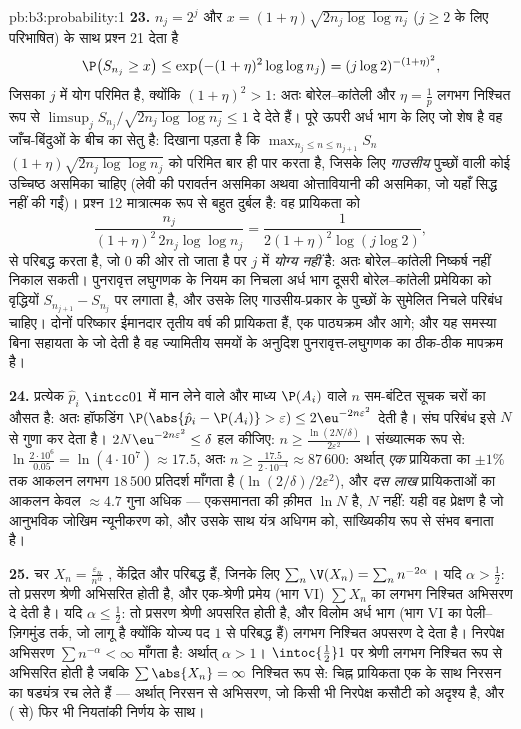 \begin{solution}{pb:b3:probability:1}
\textbf{23.} $n_j = 2^j$ और $x = (1 +
\eta)\sqrt{2n_j\log\log n_j}$ ($j \geq 2$ के लिए परिभाषित)
के साथ प्रश्न 21 देता है
\[
\P\bigl(S_{n_j} \geq x\bigr) \leq \exp\bigl(-(1 +
\eta)^2\log\log n_j\bigr) = (j\log 2)^{-(1+\eta)^2},
\]
जिसका $j$ में योग परिमित है, क्योंकि $(1 + \eta)^2 > 1$:
अतः बोरेल--कांतेली और $\eta = \frac1p$ लगभग निश्चित रूप से
$\limsup_jS_{n_j}/\sqrt{2n_j
\log\log n_j} \leq 1$ दे देते हैं। पूरे ऊपरी अर्ध भाग के लिए
जो शेष है वह जाँच-बिंदुओं के बीच का सेतु है: दिखाना पड़ता है
कि $\max_{n_j\leq n\leq n_{j+1}}S_n$
$(1+\eta)\sqrt{2n_j\log\log n_j}$ को परिमित बार ही पार करता
है, जिसके लिए \emph{गाउसीय} पुच्छों वाली कोई उच्चिष्ठ असमिका
चाहिए (लेवी की परावर्तन असमिका अथवा ओत्तावियानी की असमिका,
जो यहाँ सिद्ध नहीं की गईं)। प्रश्न 12 मात्रात्मक रूप से बहुत
दुर्बल है: वह प्रायिकता को
\[
\frac{n_j}{(1+\eta)^2\,2n_j\log\log n_j}
= \frac{1}{2(1+\eta)^2\log(j\log2)},
\]
से परिबद्ध करता है, जो $0$ की ओर तो जाता है पर $j$ में
\emph{योग्य नहीं} है: अतः बोरेल--कांतेली निष्कर्ष नहीं निकाल
सकती। पुनरावृत्त लघुगणक के नियम का निचला अर्ध भाग दूसरी
बोरेल--कांतेली प्रमेयिका को  वृद्धियों $S_{n_{j+1}}
- S_{n_j}$ पर लगाता है, और उसके लिए गाउसीय-प्रकार के पुच्छों
के सुमेलित निचले परिबंध चाहिए। दोनों परिष्कार ईमानदार तृतीय
वर्ष की प्रायिकता हैं, एक पाठ्यक्रम और आगे; और यह समस्या बिना
सहायता के जो देती है वह ज्यामितीय समयों के अनुदिश
पुनरावृत्त-लघुगणक का ठीक-ठीक मापक्रम है।

\textbf{24.} प्रत्येक $\hat p_i$ $\intcc01$ में मान लेने
वाले और माध्य $\P(A_i)$ वाले $n$  सम-बंटित सूचक चरों
का औसत है: अतः हॉफडिंग $\P(\abs{\hat p_i - \P(A_i)} >
\varepsilon) \leq 2\eu^{-2n\varepsilon^2}$ देती है। संघ
परिबंध इसे $N$ से गुणा कर देता है। $2N\eu^{-2n\varepsilon^2}
\leq \delta$ हल कीजिए: $n \geq
\frac{\ln(2N/\delta)}{2\varepsilon^2}$। संख्यात्मक रूप से:
$\ln\frac{2\cdot10^6}{0.05} =
\ln(4\cdot10^7) \approx 17.5$, अतः $n \geq
\frac{17.5}{2\cdot10^{-4}} \approx 87\,600$: अर्थात्
\emph{एक} प्रायिकता का $\pm1\%$ तक आकलन लगभग $18\,500$
प्रतिदर्श माँगता है ($\ln(2/\delta)/2\varepsilon^2$), और
\emph{दस लाख} प्रायिकताओं का आकलन केवल $\approx 4.7$ गुना
अधिक --- एकसमानता की क़ीमत $\ln N$ है, $N$ नहीं: यही वह
प्रेक्षण है जो आनुभविक जोखिम न्यूनीकरण को, और उसके साथ यंत्र
अधिगम को, सांख्यिकीय रूप से संभव बनाता है।

\textbf{25.} चर $X_n = \frac{\varepsilon_n}
{n^\alpha}$ , केंद्रित और परिबद्ध हैं, जिनके लिए
$\sum_n\V(X_n) = \sum_nn^{-2\alpha}$। यदि $\alpha >
\frac12$: तो प्रसरण श्रेणी अभिसरित होती है, और एक-श्रेणी
प्रमेय (भाग VI) $\sum X_n$ का लगभग निश्चित अभिसरण दे देती
है। यदि $\alpha \leq \frac12$: तो प्रसरण श्रेणी अपसरित होती
है, और विलोम अर्ध भाग (भाग VI का पेली--ज़िगमुंड तर्क, जो लागू
है क्योंकि योज्य पद $1$ से परिबद्ध हैं) लगभग निश्चित अपसरण
दे देता है। निरपेक्ष अभिसरण $\sum n^{-\alpha} < \infty$
माँगता है: अर्थात् $\alpha > 1$। $\intoc{\frac12}1$ पर
श्रेणी लगभग निश्चित रूप से अभिसरित होती है जबकि
$\sum\abs{X_n} = \infty$ निश्चित रूप से: चिह्न प्रायिकता एक
के साथ निरसन का षड्यंत्र रच लेते हैं --- अर्थात् निरसन से
अभिसरण, जो किसी भी निरपेक्ष कसौटी को अदृश्य है, और ( से) फिर भी नियतांकी निर्णय के साथ।
\end{solution}
